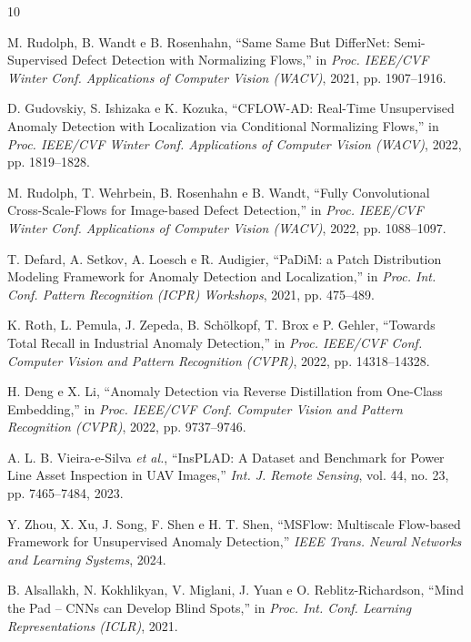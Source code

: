 \documentclass[conference]{IEEEtran}
\begin{document}
\begin{thebibliography}{10}

M. Rudolph, B. Wandt e B. Rosenhahn, ``Same Same But DifferNet: Semi-Supervised Defect Detection with Normalizing Flows,'' in \textit{Proc. IEEE/CVF Winter Conf. Applications of Computer Vision (WACV)}, 2021, pp. 1907--1916.

D. Gudovskiy, S. Ishizaka e K. Kozuka, ``CFLOW-AD: Real-Time Unsupervised Anomaly Detection with Localization via Conditional Normalizing Flows,'' in \textit{Proc. IEEE/CVF Winter Conf. Applications of Computer Vision (WACV)}, 2022, pp. 1819--1828.

M. Rudolph, T. Wehrbein, B. Rosenhahn e B. Wandt, ``Fully Convolutional Cross-Scale-Flows for Image-based Defect Detection,'' in \textit{Proc. IEEE/CVF Winter Conf. Applications of Computer Vision (WACV)}, 2022, pp. 1088--1097.

T. Defard, A. Setkov, A. Loesch e R. Audigier, ``PaDiM: a Patch Distribution Modeling Framework for Anomaly Detection and Localization,'' in \textit{Proc. Int. Conf. Pattern Recognition (ICPR) Workshops}, 2021, pp. 475--489.

K. Roth, L. Pemula, J. Zepeda, B. Sch\"{o}lkopf, T. Brox e P. Gehler, ``Towards Total Recall in Industrial Anomaly Detection,'' in \textit{Proc. IEEE/CVF Conf. Computer Vision and Pattern Recognition (CVPR)}, 2022, pp. 14318--14328.

H. Deng e X. Li, ``Anomaly Detection via Reverse Distillation from One-Class Embedding,'' in \textit{Proc. IEEE/CVF Conf. Computer Vision and Pattern Recognition (CVPR)}, 2022, pp. 9737--9746.

A. L. B. Vieira-e-Silva \textit{et al.}, ``InsPLAD: A Dataset and Benchmark for Power Line Asset Inspection in UAV Images,'' \textit{Int. J. Remote Sensing}, vol. 44, no. 23, pp. 7465--7484, 2023.

Y. Zhou, X. Xu, J. Song, F. Shen e H. T. Shen, ``MSFlow: Multiscale Flow-based Framework for Unsupervised Anomaly Detection,'' \textit{IEEE Trans. Neural Networks and Learning Systems}, 2024.

B. Alsallakh, N. Kokhlikyan, V. Miglani, J. Yuan e O. Reblitz-Richardson, ``Mind the Pad -- CNNs can Develop Blind Spots,'' in \textit{Proc. Int. Conf. Learning Representations (ICLR)}, 2021.


\end{thebibliography}
\end{document}
